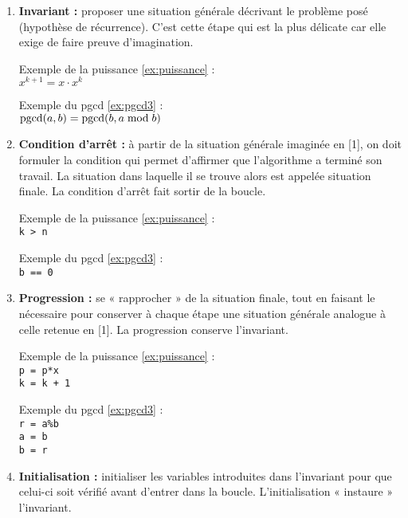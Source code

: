 \begin{enumerate}
\item {\bf Invariant :} proposer une situation générale décrivant le problème posé (hypothèse de
	récurrence). C'est cette étape qui est la plus délicate car elle exige de faire 
	preuve d'imagination.
	
	\begin{minipage}[t]{6cm}
	Exemple de la puissance \ref{ex:puissance} :\\
	$x^{k+1} = x\cdot x^k$
	\end{minipage}
	\hfill
	\begin{minipage}[t]{6cm}
	Exemple du pgcd \ref{ex:pgcd3} :\\
	${\rm pgcd}(a,b) = {\rm pgcd}(b,a \bmod b)$
	\end{minipage}
\item {\bf Condition d'arrêt :}  à partir de la situation générale imaginée en [1], on doit
	formuler la condition qui permet d'affirmer que l'algorithme a terminé son travail. 
	La situation dans laquelle il se trouve alors est appelée situation finale.
	La condition d'arrêt fait sortir de la boucle.
	
	\begin{minipage}[t]{6cm}
	Exemple de la puissance \ref{ex:puissance} :\\
	{\tt k > n}
	\end{minipage}
	\hfill
	\begin{minipage}[t]{6cm}
	Exemple du pgcd \ref{ex:pgcd3} :\\
	{\tt b == 0}
	\end{minipage}
\item {\bf Progression :} se « rapprocher » de la situation finale, tout en faisant le nécessaire pour
	conserver à chaque étape une situation générale analogue à celle retenue en [1].
	La progression conserve l'invariant.
	
	\begin{minipage}[t]{6cm}
	Exemple de la puissance \ref{ex:puissance} :\\
	{\tt p = p*x}\\
	{\tt k = k + 1}
	\end{minipage}
	\hfill
	\begin{minipage}[t]{6cm}
	Exemple du pgcd \ref{ex:pgcd3} :\\
	{\tt r = a\%b}\\
	{\tt a = b}\\
	{\tt b = r}
	\end{minipage}
\item {\bf Initialisation :} initialiser les variables introduites dans l'invariant 
	pour que celui-ci soit vérifié avant d'entrer dans la boucle.
	L'initialisation « instaure » l'invariant.
	

\end{enumerate}
